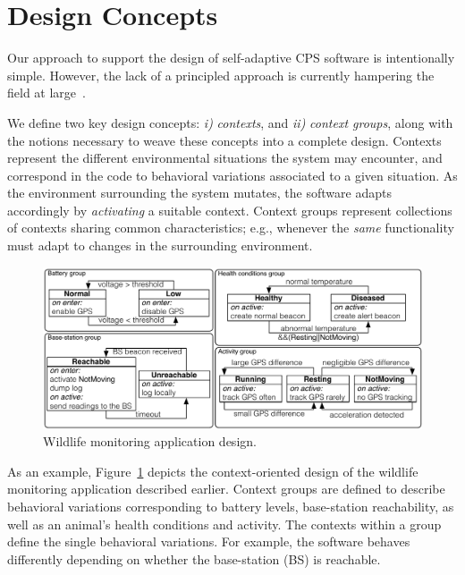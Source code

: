 \section{Design Concepts}
\label{sec:design}

Our approach to support the design of self-adaptive CPS software is
intentionally simple. However, the lack of a principled approach is
currently hampering the field at
large~\cite{Picco:2010:SEW:1882362.1882421}. %

We define two key design concepts: \emph{i)} \emph{contexts}, and
\emph{ii)} \emph{context groups}, along with the notions necessary to
weave these concepts into a complete design.  Contexts represent the
different environmental situations the system may encounter, and
correspond in the code to behavioral variations associated to a given
situation. As the environment surrounding the system mutates, the
software adapts accordingly by \emph{activating} a suitable
context. Context groups represent collections of contexts sharing
common characteristics; e.g., whenever the \emph{same} functionality
must adapt to changes in the surrounding environment. 

\begin{figure}
\begin{center}
\includegraphics[scale=.43]{imgs/wildlifetracking-simple}
\vspace{-4mm}
\caption{Wildlife monitoring application design.}
  \label{fig:design}
\vspace{-6mm}
\end{center}
\end{figure}

As an example, Figure~\ref{fig:design} depicts the
context-oriented design of the wildlife monitoring application
described earlier. Context groups are defined to describe behavioral
variations corresponding to battery levels, base-station reachability,
as well as an animal's health conditions and activity. The contexts
within a group define the single behavioral variations. For example,
the software behaves differently depending on whether the
base-station (BS) is reachable. 

